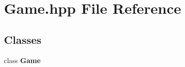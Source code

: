 \section{Game.\-hpp File Reference}
\label{_game_8hpp}
\subsection*{Classes}
\begin{DoxyCompactItemize}
\item 
class {\bf Game}
\end{DoxyCompactItemize}
